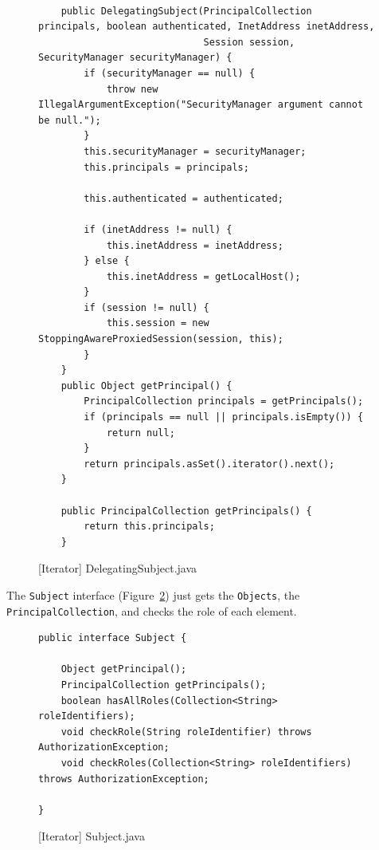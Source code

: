 \begin{figure}[htb]
\centering
\lstset{language=Java, basicstyle=\scriptsize, stepnumber=1, showspaces=false, showstringspaces=false,breaklines=true}
\begin{lstlisting}

    public DelegatingSubject(PrincipalCollection principals, boolean authenticated, InetAddress inetAddress,
                             Session session, SecurityManager securityManager) {
        if (securityManager == null) {
            throw new IllegalArgumentException("SecurityManager argument cannot be null.");
        }
        this.securityManager = securityManager;
        this.principals = principals;

        this.authenticated = authenticated;

        if (inetAddress != null) {
            this.inetAddress = inetAddress;
        } else {
            this.inetAddress = getLocalHost();
        }
        if (session != null) {
            this.session = new StoppingAwareProxiedSession(session, this);
        }
    }
    public Object getPrincipal() {
        PrincipalCollection principals = getPrincipals();
        if (principals == null || principals.isEmpty()) {
            return null;
        }
        return principals.asSet().iterator().next();
    }

    public PrincipalCollection getPrincipals() {
        return this.principals;
    }

\end{lstlisting}
\caption{[Iterator] DelegatingSubject.java}
\label{fig:DelegatingSubject}
\end{figure}
\FloatBarrier

The \texttt{Subject} interface (Figure~\ref{fig:Subject}) just gets the \texttt{Objects}, the \texttt{PrincipalCollection}, and checks the role of each element.

\begin{figure}[htb]
\centering
\lstset{language=Java, basicstyle=\scriptsize, stepnumber=1, showspaces=false, showstringspaces=false,breaklines=true}
\begin{lstlisting}
public interface Subject {

    Object getPrincipal();
    PrincipalCollection getPrincipals();
    boolean hasAllRoles(Collection<String> roleIdentifiers);
    void checkRole(String roleIdentifier) throws AuthorizationException;
    void checkRoles(Collection<String> roleIdentifiers) throws AuthorizationException;

}
\end{lstlisting}
\caption{[Iterator] Subject.java}
\label{fig:Subject}
\end{figure}
\FloatBarrier

